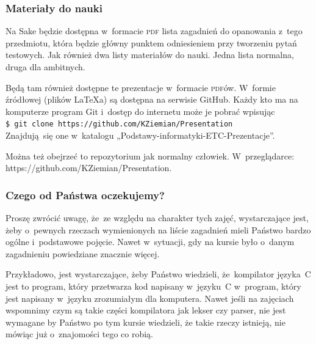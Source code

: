 \documentclass[10pt,t]{beamer}
\begin{document}
\begin{frame}
  \frametitle{Materiały do nauki}


  Na Sake będzie dostępna w~formacie \textsc{pdf} \alert{lista zagadnień do
    opanowania z~tego przedmiotu}, która będzie główny punktem odniesieniem
  przy tworzeniu pytań testowych. Jak również dwa listy materiałów do nauki.
  Jedna lista normalna, druga dla ambitnych.

  Będą tam również dostępne te prezentacje w~formacie \textsc{pdf}ów.
  W~formie źródłowej (plików \LaTeX a) są dostępna na serwisie GitHub.
  Każdy kto ma na komputerze program Git i~dostęp do internetu może je
  pobrać wpisując \\
  \texttt{\$ git clone https://github.com/KZiemian/Presentation} \\
  Znajdują~się one w~katalogu „Podstawy-informatyki-ETC-Prezentacje”.

  Można też obejrzeć to repozytorium jak normalny człowiek. W~przeglądarce:
  {https://github.com/KZiemian/Presentation}.

\end{frame}





\begin{frame}
  \frametitle{Czego od Państwa oczekujemy?}


  Proszę zwrócić uwagę, że~ze względu na charakter tych zajęć, wystarczające
  jest, żeby o~pewnych rzeczach wymienionych na liście zagadnień mieli
  Państwo bardzo ogólne i~podstawowe pojęcie. Nawet w~sytuacji, gdy na
  kursie było o~danym zagadnieniu powiedziane znacznie więcej.

  Przykładowo, jest wystarczające, żeby Państwo wiedzieli, że~kompilator
  języka~C jest to program, który przetwarza kod napisany w~języku~C
  w~program, który jest napisany w~języku zrozumiałym dla komputera.
  Nawet jeśli na zajęciach wspomnimy czym są takie części kompilatora
  jak lekser czy parser, nie jest wymagane by Państwo po tym kursie
  wiedzieli, że takie rzeczy istnieją, nie mówiąc już o~znajomości tego
  co robią.

\end{frame}
\end{document}
